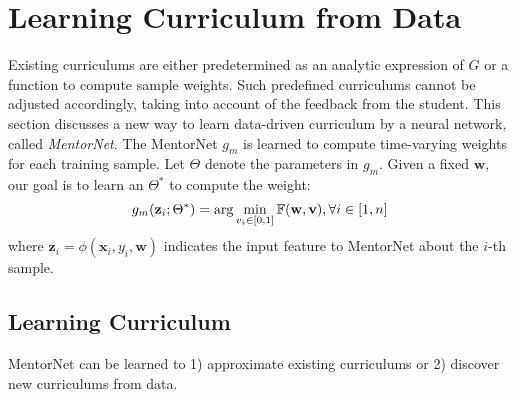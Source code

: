 \documentclass{article}
\begin{document}
\vspace{-3mm}
\section{Learning Curriculum from Data}\label{sec:mentornet}
Existing curriculums are either predetermined as an analytic expression of $G$ or a function to compute sample weights. Such predefined curriculums cannot be adjusted accordingly, taking into account of the feedback from the student. This section discusses a new way to learn data-driven curriculum by a neural network, called \emph{MentorNet}. The MentorNet $g_m$ is learned to compute time-varying weights for each training sample. Let $\Theta$ denote the parameters in $g_m$. Given a fixed $\mathbf{w}$, our goal is to learn an $\Theta^*$ to compute the weight:
\vspace{-1mm}
\begin{equation}
\label{eq:gm_obj}
g_m(\mathbf{z}_i; \Theta^*) = \arg\min_{v_i \in [0,1]} \mathbb{F} (\mathbf{w}, \mathbf{v}), \forall i \in [1,n]
\vspace{-2mm}
\end{equation}
where $\mathbf{z}_i = \phi(\mathbf{x}_i, y_i, \mathbf{w})$ indicates the input feature to MentorNet about the $i$-th sample.

\subsection{Learning Curriculum}\label{sec:learning_curriculum}
MentorNet can be learned to 1) approximate existing curriculums or 2) discover new curriculums from data. 
\end{document}
